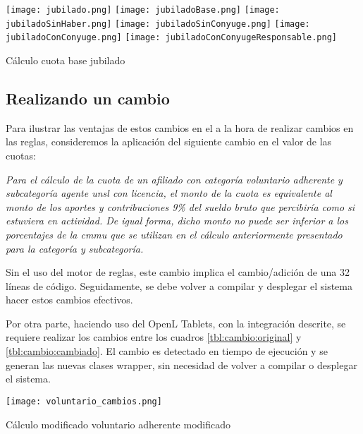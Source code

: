 \begin{table*}
    \centering
    \texttt{[image: jubilado.png]}
    \texttt{[image: jubiladoBase.png]}
    \texttt{[image: jubiladoSinHaber.png]}
    \texttt{[image: jubiladoSinConyuge.png]}
    \texttt{[image: jubiladoConConyuge.png]}
    \texttt{[image: jubiladoConConyugeResponsable.png]}
    \caption{Cálculo cuota base jubilado}
    \label{tbl:calculo:jubilado}
\end{table*}

\subsection{Realizando un cambio}\label{ssec:integracion:cambio}
Para ilustrar las ventajas de estos cambios en el \SIDOSPU a la hora de realizar cambios en las reglas, consideremos la aplicación del siguiente cambio en el valor de las cuotas:

\emph{
    Para el cálculo de la cuota de un afiliado con categoría voluntario adherente y subcategoría agente \acrshort{unsl} con licencia, el monto de la cuota es equivalente al monto de los aportes y contribuciones 9\% del sueldo bruto que percibiría como si estuviera en actividad. De igual forma, dicho monto no puede ser inferior a los porcentajes de la \acrshort{cmmu} que se utilizan en el cálculo anteriormente presentado para la categoría y subcategoría.
}

Sin el uso del motor de reglas, este cambio implica el cambio/adición de una 32 líneas de código. Seguidamente, se debe volver a compilar y desplegar el sistema hacer estos cambios efectivos.

Por otra parte, haciendo uso del OpenL Tablets, con la integración descrite, se requiere realizar los cambios entre los cuadros \ref{tbl:cambio:original} y \ref{tbl:cambio:cambiado}. El cambio es detectado en tiempo de ejecución y se generan las nuevas clases wrapper, sin necesidad de volver a compilar o desplegar el sistema.



\begin{table*}
    \centering
    \texttt{[image: voluntario\_cambios.png]}
    \caption{Cálculo modificado voluntario adherente modificado}
    \label{tbl:cambio:cambiado}
\end{table*}
